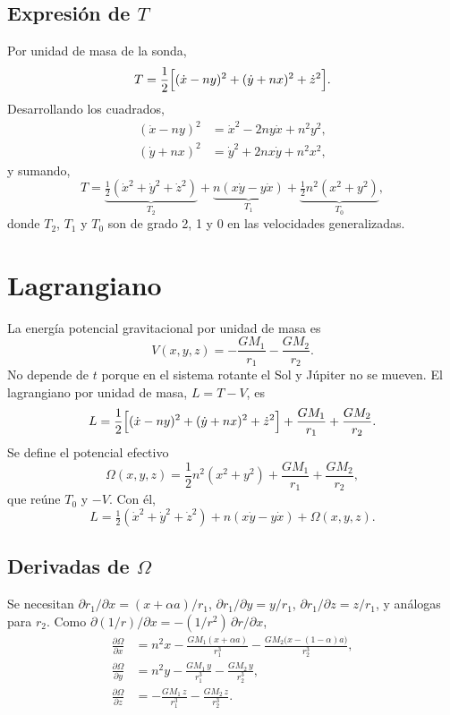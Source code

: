 \documentclass[12pt,letterpaper]{article}
\begin{document}
\subsection{Expresión de $T$}

Por unidad de masa de la sonda,
\begin{equation}
T = \frac12\Bigl[(\dot x - n y)^2 + (\dot y + n x)^2 + \dot z^2\Bigr].
\label{eq:T}
\end{equation}
Desarrollando los cuadrados,
\begin{align*}
(\dot x - ny)^2 &= \dot x^2 - 2n y\dot x + n^2 y^2,\\
(\dot y + nx)^2 &= \dot y^2 + 2n x\dot y + n^2 x^2,
\end{align*}
y sumando,
\[
T = \underbrace{\tfrac12(\dot x^2+\dot y^2+\dot z^2)}_{T_2}
  + \underbrace{n(x\dot y - y\dot x)}_{T_1}
  + \underbrace{\tfrac12 n^2(x^2+y^2)}_{T_0},
\]
donde $T_2$, $T_1$ y $T_0$ son de grado 2, 1 y 0 en las velocidades generalizadas.

\section{Lagrangiano}

La energía potencial gravitacional por unidad de masa es
\[
V(x,y,z) = -\frac{GM_1}{r_1} - \frac{GM_2}{r_2}.
\]
No depende de $t$ porque en el sistema rotante el Sol y Júpiter no se mueven. El lagrangiano
por unidad de masa, $L = T - V$, es
\begin{equation}
L = \frac12\Bigl[(\dot x - n y)^2 + (\dot y + n x)^2 + \dot z^2\Bigr]
    + \frac{GM_1}{r_1} + \frac{GM_2}{r_2}.
\label{eq:L}
\end{equation}
Se define el potencial efectivo
\begin{equation}
\Omega(x,y,z) = \frac12 n^2(x^2+y^2) + \frac{GM_1}{r_1} + \frac{GM_2}{r_2},
\label{eq:Omega}
\end{equation}
que reúne $T_0$ y $-V$. Con él,
\[
L = \tfrac12(\dot x^2+\dot y^2+\dot z^2) + n(x\dot y - y\dot x) + \Omega(x,y,z).
\]

\subsection{Derivadas de $\Omega$}

Se necesitan $\partial r_1/\partial x = (x+\alpha a)/r_1$, $\partial r_1/\partial y = y/r_1$,
$\partial r_1/\partial z = z/r_1$, y análogas para $r_2$. Como
$\partial(1/r)/\partial x = -(1/r^2)\,\partial r/\partial x$,
\begin{align}
\frac{\partial\Omega}{\partial x} &= n^2 x - \frac{GM_1(x+\alpha a)}{r_1^3} - \frac{GM_2\bigl(x-(1-\alpha)a\bigr)}{r_2^3},
\label{eq:Ox}\\
\frac{\partial\Omega}{\partial y} &= n^2 y - \frac{GM_1\, y}{r_1^3} - \frac{GM_2\, y}{r_2^3},
\label{eq:Oy}\\
\frac{\partial\Omega}{\partial z} &= - \frac{GM_1\, z}{r_1^3} - \frac{GM_2\, z}{r_2^3}.
\label{eq:Oz}
\end{align}
\end{document}
